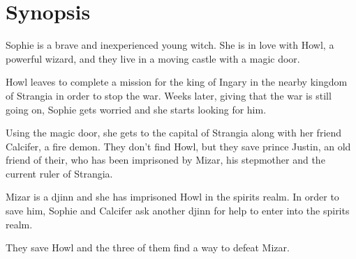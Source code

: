 \section{Synopsis}

Sophie is a brave and inexperienced young witch. She is in love with Howl, a powerful wizard, and they live in a moving castle with a magic door.

Howl leaves to complete a mission for the king of Ingary in the nearby kingdom of Strangia in order to stop the war. Weeks later, giving that the war is still going on, Sophie gets worried and she starts looking for him.

Using the magic door, she gets to the capital of Strangia along with her friend Calcifer, a fire demon. They don’t find Howl, but they save prince Justin, an old friend of their, who has been imprisoned by Mizar, his stepmother and the current ruler of Strangia.

Mizar is a djinn and she has imprisoned Howl in the spirits realm. In order to save him, Sophie and Calcifer ask another djinn for help to enter into the spirits realm.

They save Howl and the three of them find a way to defeat Mizar.

